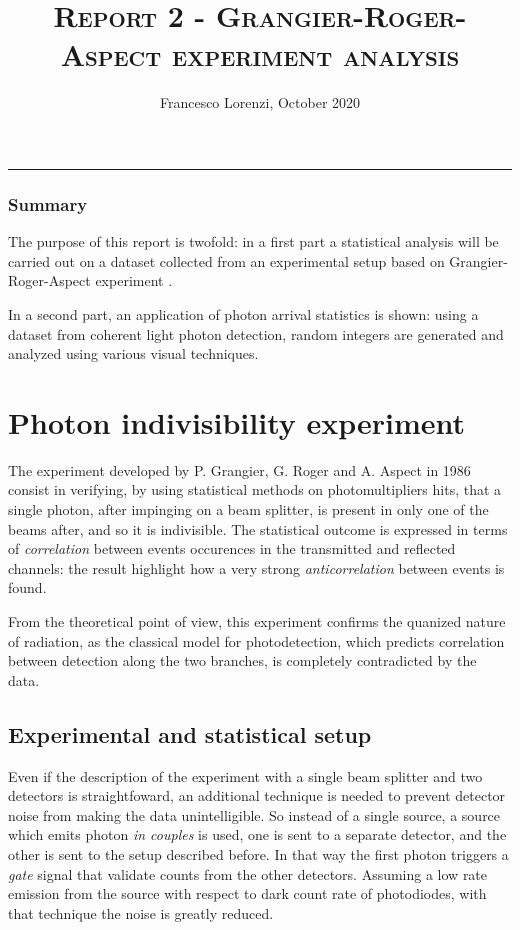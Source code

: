 \documentclass[10pt, final]{article}
\title{\textsc{Report 2 - Grangier-Roger-Aspect experiment analysis}}
\author{Francesco Lorenzi,      October 2020}
\date{}
\begin{document}
\maketitle
\vspace{-25pt}

\begin{center}
	\rule[0pt]{400pt}{0.5pt}
\end{center}
\vspace{-15pt}

\begin{multicols}{2}
\subsubsection*{Summary}
The purpose of this report is twofold: in a first part a statistical analysis will be carried out on a dataset collected from an experimental setup based on Grangier-Roger-Aspect experiment \cite{grangier}. 

In a second part, an application of photon arrival statistics is shown: using a dataset from coherent light photon detection, random integers are generated and analyzed using various visual techniques.

\section{Photon indivisibility experiment}
The experiment developed by P. Grangier, G. Roger and A. Aspect in 1986 consist in verifying, by using statistical methods on photomultipliers hits, that a single  photon, after impinging on a beam splitter, is present in only one of the beams after, and so it is indivisible. The statistical outcome is expressed in terms of \emph{correlation} between events occurences in the transmitted and reflected channels: the result highlight how a very strong \emph{anticorrelation} between events is found.

From the theoretical point of view, this experiment confirms the quanized nature of radiation, as the classical model for photodetection, which predicts correlation between detection along the two branches, is completely contradicted by the data.
\subsection*{Experimental and statistical setup}
Even if the description of the experiment with a single beam splitter and two detectors is straightfoward, an additional technique is needed to prevent detector noise from making the data unintelligible.
So instead of a single source, a source which emits photon \emph{in couples} is used, one is sent to a separate detector, and the other is sent to the setup described before. In that way the first photon triggers a \emph{gate} signal that validate counts from the other detectors. Assuming a low rate emission from the source with respect to dark count rate of photodiodes, with that technique the noise is greatly reduced.


\end{multicols}
\end{document}
